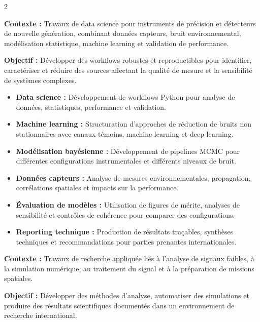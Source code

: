 \documentclass[8pt,a4paper,ragged2e,withhyper]{altacv}
\begin{document}
\begin{paracol}{2}

\textbf{Contexte :} Travaux de data science pour instruments de précision et détecteurs de nouvelle génération, combinant données capteurs, bruit environnemental, modélisation statistique, machine learning et validation de performance.

\textbf{Objectif :} Développer des workflows robustes et reproductibles pour identifier, caractériser et réduire des sources affectant la qualité de mesure et la sensibilité de systèmes complexes.

\begin{itemize}
  \item \textbf{Data science :} Développement de workflows Python pour analyse de données, statistiques, performance et validation.
  \item \textbf{Machine learning :} Structuration d’approches de réduction de bruits non stationnaires avec canaux témoins, machine learning et deep learning.
  \item \textbf{Modélisation bayésienne :} Développement de pipelines MCMC pour différentes configurations instrumentales et différents niveaux de bruit.
  \item \textbf{Données capteurs :} Analyse de mesures environnementales, propagation, corrélations spatiales et impacts sur la performance.
  \item \textbf{Évaluation de modèles :} Utilisation de figures de mérite, analyses de sensibilité et contrôles de cohérence pour comparer des configurations.
  \item \textbf{Reporting technique :} Production de résultats traçables, synthèses techniques et recommandations pour parties prenantes internationales.
\end{itemize}

\divider


\textbf{Contexte :} Travaux de recherche appliquée liés à l’analyse de signaux faibles, à la simulation numérique, au traitement du signal et à la préparation de missions spatiales.

\textbf{Objectif :} Développer des méthodes d’analyse, automatiser des simulations et produire des résultats scientifiques documentés dans un environnement de recherche international.


\end{paracol}
\end{document}

